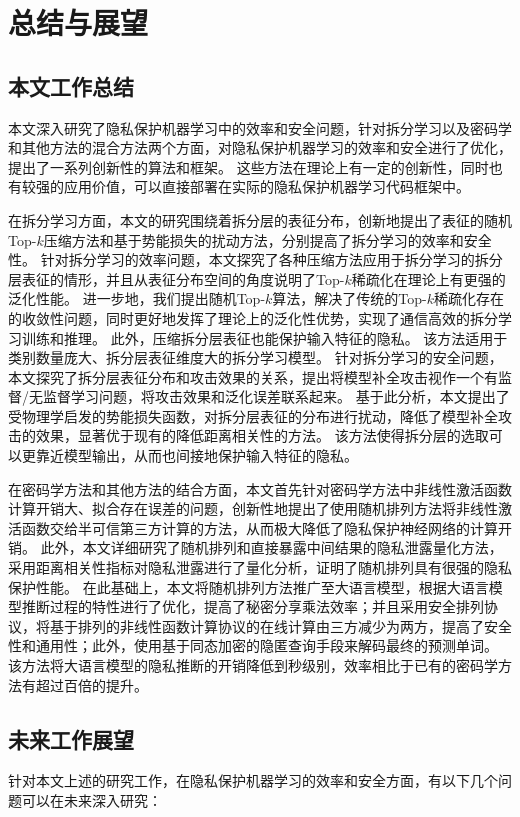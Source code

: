 \chapter{总结与展望}
\section{本文工作总结}
本文深入研究了隐私保护机器学习中的效率和安全问题，针对拆分学习以及密码学和其他方法的混合方法两个方面，对隐私保护机器学习的效率和安全进行了优化，提出了一系列创新性的算法和框架。
%
这些方法在理论上有一定的创新性，同时也有较强的应用价值，可以直接部署在实际的隐私保护机器学习代码框架中。
%

在拆分学习方面，本文的研究围绕着拆分层的表征分布，创新地提出了表征的随机Top-$k$压缩方法和基于势能损失的扰动方法，分别提高了拆分学习的效率和安全性。
%
针对拆分学习的效率问题，本文探究了各种压缩方法应用于拆分学习的拆分层表征的情形，并且从表征分布空间的角度说明了Top-$k$稀疏化在理论上有更强的泛化性能。
进一步地，我们提出随机Top-$k$算法，解决了传统的Top-$k$稀疏化存在的收敛性问题，同时更好地发挥了理论上的泛化性优势，实现了通信高效的拆分学习训练和推理。
此外，压缩拆分层表征也能保护输入特征的隐私。
%
该方法适用于类别数量庞大、拆分层表征维度大的拆分学习模型。
%
针对拆分学习的安全问题，本文探究了拆分层表征分布和攻击效果的关系，提出将模型补全攻击视作一个有监督/无监督学习问题，将攻击效果和泛化误差联系起来。
基于此分析，本文提出了受物理学启发的势能损失函数，对拆分层表征的分布进行扰动，降低了模型补全攻击的效果，显著优于现有的降低距离相关性的方法。
该方法使得拆分层的选取可以更靠近模型输出，从而也间接地保护输入特征的隐私。

在密码学方法和其他方法的结合方面，本文首先针对密码学方法中非线性激活函数计算开销大、拟合存在误差的问题，创新性地提出了使用随机排列方法将非线性激活函数交给半可信第三方计算的方法，从而极大降低了隐私保护神经网络的计算开销。
此外，本文详细研究了随机排列和直接暴露中间结果的隐私泄露量化方法，采用距离相关性指标对隐私泄露进行了量化分析，证明了随机排列具有很强的隐私保护性能。
在此基础上，本文将随机排列方法推广至大语言模型，根据大语言模型推断过程的特性进行了优化，提高了秘密分享乘法效率；并且采用安全排列协议，将基于排列的非线性函数计算协议的在线计算由三方减少为两方，提高了安全性和通用性；此外，使用基于同态加密的隐匿查询手段来解码最终的预测单词。
%
该方法将大语言模型的隐私推断的开销降低到秒级别，效率相比于已有的密码学方法有超过百倍的提升。


\section{未来工作展望}
针对本文上述的研究工作，在隐私保护机器学习的效率和安全方面，有以下几个问题可以在未来深入研究：
%

